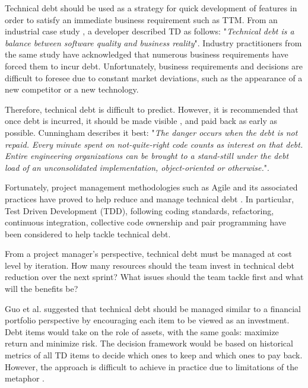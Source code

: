 \documentclass{mprop}
\begin{document}
Technical debt should be used as a strategy for quick development of features in
order to satisfy an immediate business requirement such as TTM. From an
industrial case study \cite{Lim2012}, a developer described TD as follows:
"\textit{Technical debt is a balance between software quality and business
	reality}". Industry practitioners from the same study have acknowledged that
numerous business requirements have forced them to incur debt. Unfortunately,
business requirements and decisions are difficult to foresee due to constant
market deviations, such as the appearance of a new competitor or a new
technology.

Therefore, technical debt is difficult to predict. However, it is recommended
that once debt is incurred, it should be made visible \cite{Lim2012}
\cite{Codabux2013} \cite{Morgenthaler2012}, and paid back as early as possible.
Cunningham \cite{Cunningham1993} describes it best: "\textit{The danger occurs
	when the debt is not repaid. Every minute spent on not-quite-right code counts
	as interest on that debt. Entire engineering organizations can be brought to a
	stand-still under the debt load of an unconsolidated implementation,
	object-oriented or otherwise.}".

Fortunately, project management methodologies such as Agile and its associated
practices have proved to help reduce and manage technical debt
\cite{Holvitie2014} \cite{Trumler2016}. In particular, Test Driven Development (TDD),
following coding standards, refactoring, continuous integration, collective code
ownership and pair programming have been considered to help tackle technical
debt.

From a project manager's perspective, technical debt must be managed at cost
level by iteration. How many resources should the team invest in technical debt
reduction over the next sprint? What issues should the team tackle first and
what will the benefits be?

Guo et al. \cite{Guo2011} suggested that technical debt should be managed
similar to a financial portfolio perspective by encouraging each item to be
viewed as an investment. Debt items would take on the role of assets, with the
same goals: maximize return and minimize risk. The decision framework would be
based on historical metrics of all TD items to decide which ones to keep and
which ones to pay back. However, the approach is difficult to achieve in
practice due to limitations of the metaphor \cite{Schmid2013}.
\end{document}
